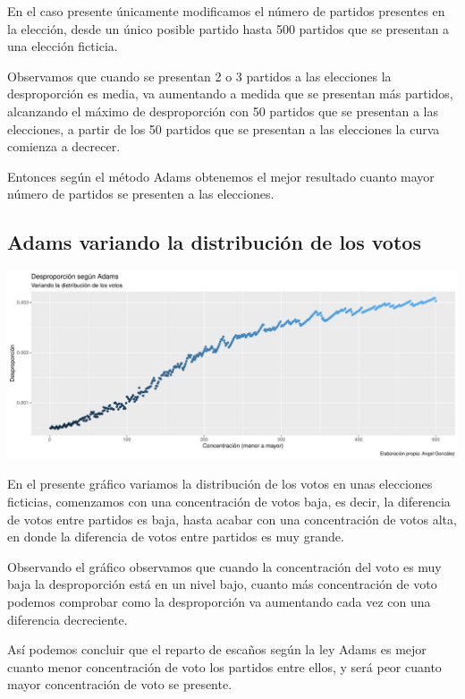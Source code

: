 \documentclass[12pt,a4paper,]{book}
\numberwithin{dummy}{section}
\theoremstyle{ocrenumbox}
\theoremstyle{blacknumex}
\theoremstyle{blacknumbox}
\theoremstyle{ocrenum}
\theoremstyle{ocrenum}
\begin{document}
En el caso presente únicamente modificamos el número de partidos
presentes en la elección, desde un único posible partido hasta 500
partidos que se presentan a una elección ficticia.

Observamos que cuando se presentan 2 o 3 partidos a las elecciones la
desproporción es media, va aumentando a medida que se presentan más
partidos, alcanzando el máximo de desproporción con 50 partidos que se
presentan a las elecciones, a partir de los 50 partidos que se presentan
a las elecciones la curva comienza a decrecer.

Entonces según el método Adams obtenemos el mejor resultado cuanto mayor
número de partidos se presenten a las elecciones.

\hypertarget{adams-variando-la-distribuciuxf3n-de-los-votos}{%
\subsection{Adams variando la distribución de los
votos}\label{adams-variando-la-distribuciuxf3n-de-los-votos}}

\begin{center}\includegraphics[width=0.95\linewidth]{figurasR/unnamed-chunk-39-1} \end{center}

En el presente gráfico variamos la distribución de los votos en unas
elecciones ficticias, comenzamos con una concentración de votos baja, es
decir, la diferencia de votos entre partidos es baja, hasta acabar con
una concentración de votos alta, en donde la diferencia de votos entre
partidos es muy grande.

Observando el gráfico observamos que cuando la concentración del voto es
muy baja la desproporción está en un nivel bajo, cuanto más
concentración de voto podemos comprobar como la desproporción va
aumentando cada vez con una diferencia decreciente.

Así podemos concluir que el reparto de escaños según la ley Adams es
mejor cuanto menor concentración de voto los partidos entre ellos, y
será peor cuanto mayor concentración de voto se presente.
\end{document}
